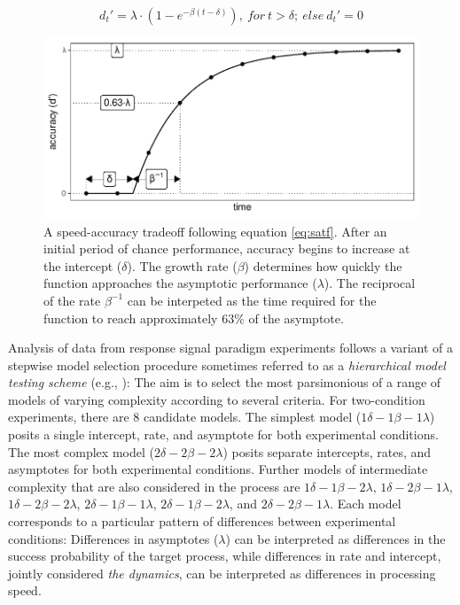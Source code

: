 \documentclass[10pt,letterpaper]{article}
\begin{document}
\begin{equation}
d_t' = \lambda \cdot \left(1-e^{-\beta(t-\delta)} \right),~for~t > \delta;~else~d_t'=0
\label{eq:satf}
\end{equation}

\begin{figure}[t]
\centering
\includegraphics{../figures/illustrations/illustration_satf.pdf} %
\caption{\label{fig:illustrationSATF}A speed-accuracy tradeoff following equation \ref{eq:satf}. After an initial period of chance performance, accuracy begins to increase at the intercept ($\delta$). The growth rate ($\beta$) determines how quickly the function approaches the asymptotic performance ($\lambda$).
The reciprocal of the rate $\beta^{-1}$ can be interpeted as the time required for the function to reach approximately $63\%$ of the asymptote.
}
\end{figure}


Analysis of data from response signal paradigm experiments follows a variant of a stepwise model selection procedure sometimes referred to as a \textit{hierarchical model testing scheme} (e.g., ):
The aim is to select the most parsimonious of a range of models of varying complexity according to several criteria. For two-condition experiments, there are 8 candidate models. The simplest model (\(1\delta-1\beta-1\lambda\)) posits a single intercept, rate, and asymptote for both experimental conditions. The most complex model (\(2\delta-2\beta-2\lambda\)) posits separate intercepts, rates, and asymptotes for both experimental conditions. Further models of intermediate complexity that are also considered in the process are \(1\delta-1\beta-2\lambda\), \(1\delta-2\beta-1\lambda\), \(1\delta-2\beta-2\lambda\),
\(2\delta-1\beta-1\lambda\), \(2\delta-1\beta-2\lambda\), and
\(2\delta-2\beta-1\lambda\).
Each model corresponds to a particular pattern of differences between experimental conditions: Differences in asymptotes ($\lambda$) can be interpreted as differences in the success probability of the target process, while differences in rate and intercept, jointly considered \textit{the dynamics}, can be interpreted as differences in processing speed.
\end{document}
